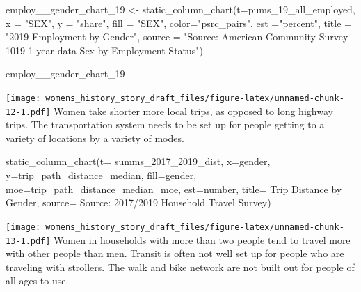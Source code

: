 \documentclass[
  12pt,
]{article}
\newenvironment{Shaded}{\begin{snugshade}}{\end{snugshade}}
\newcommand{\AttributeTok}[1]{\textcolor[rgb]{0.77,0.63,0.00}{#1}}
\newcommand{\FunctionTok}[1]{\textcolor[rgb]{0.00,0.00,0.00}{#1}}
\newcommand{\NormalTok}[1]{#1}
\newcommand{\OtherTok}[1]{\textcolor[rgb]{0.56,0.35,0.01}{#1}}
\newcommand{\StringTok}[1]{\textcolor[rgb]{0.31,0.60,0.02}{#1}}
\begin{document}
\begin{flushleft}
\begin{Shaded}
\begin{Highlighting}[]
\NormalTok{employ\_\_gender\_chart\_19 }\OtherTok{\textless{}{-}} \FunctionTok{static\_column\_chart}\NormalTok{(}\AttributeTok{t=}\NormalTok{pums\_19\_all\_employed, }
                                    \AttributeTok{x =} \StringTok{"SEX"}\NormalTok{,}
                                    \AttributeTok{y =} \StringTok{"share"}\NormalTok{,}
                                    \AttributeTok{fill =} \StringTok{"SEX"}\NormalTok{,}
                                    \AttributeTok{color=}\StringTok{"psrc\_pairs"}\NormalTok{,}
                                    \AttributeTok{est =}\StringTok{"percent"}\NormalTok{,}
                                    \AttributeTok{title =} \StringTok{"2019 Employment by Gender"}\NormalTok{,}
                                    \AttributeTok{source =} \StringTok{"Source: American Community Survey 1019 1{-}year data Sex by Employment Status"}\NormalTok{)}

\NormalTok{employ\_\_gender\_chart\_19}
\end{Highlighting}
\end{Shaded}

\texttt{[image: womens\_history\_story\_draft\_files/figure-latex/unnamed-chunk-12-1.pdf]}
Women take shorter more local trips, as opposed to long highway trips.
The transportation system needs to be set up for people getting to a
variety of locations by a variety of modes.

\begin{Shaded}
\begin{Highlighting}[]
\FunctionTok{static\_column\_chart}\NormalTok{(}\AttributeTok{t=}\NormalTok{ summs\_2017\_2019\_dist, }\AttributeTok{x=}\StringTok{\textquotesingle{}gender\textquotesingle{}}\NormalTok{, }\AttributeTok{y=}\StringTok{\textquotesingle{}trip\_path\_distance\_median\textquotesingle{}}\NormalTok{,  }\AttributeTok{fill=}\StringTok{\textquotesingle{}gender\textquotesingle{}}\NormalTok{, }\AttributeTok{moe=}\StringTok{\textquotesingle{}trip\_path\_distance\_median\_moe\textquotesingle{}}\NormalTok{, }\AttributeTok{est=}\StringTok{\textquotesingle{}number\textquotesingle{}}\NormalTok{, }\AttributeTok{title=}\StringTok{\textquotesingle{} Trip Distance by Gender\textquotesingle{}}\NormalTok{, }\AttributeTok{source=} \StringTok{\textquotesingle{}Source: 2017/2019 Household Travel Survey\textquotesingle{}}\NormalTok{)}
\end{Highlighting}
\end{Shaded}

\texttt{[image: womens\_history\_story\_draft\_files/figure-latex/unnamed-chunk-13-1.pdf]}
Women in households with more than two people tend to travel more with
other people than men. Transit is often not well set up for people who
are traveling with strollers. The walk and bike network are not built
out for people of all ages to use.


\end{flushleft}
\end{document}
